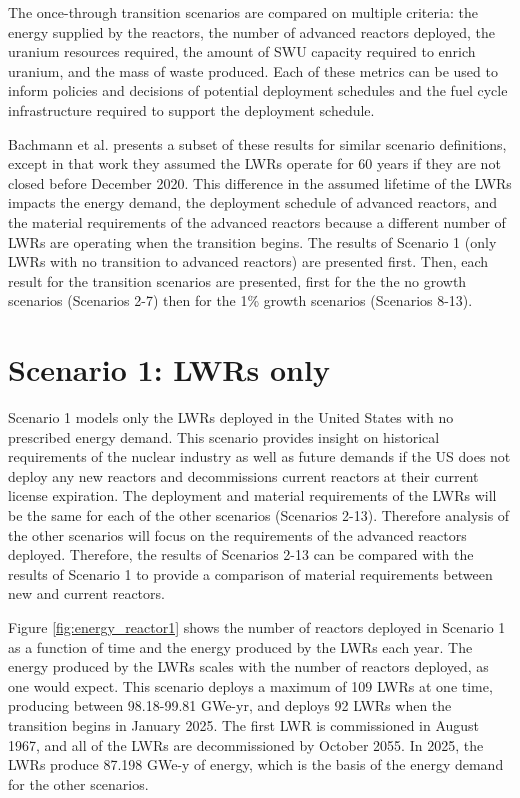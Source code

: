 The once-through transition scenarios are compared on multiple 
criteria: the energy supplied by the reactors, the number of advanced reactors deployed, 
the uranium resources required, the amount of \gls{SWU} capacity required 
to enrich uranium,
and the mass of waste produced. Each of these metrics can be used to inform 
policies and decisions of potential deployment schedules and the 
fuel cycle infrastructure required to support the deployment schedule. 

Bachmann et al. \cite{bachmann_enrichment_2021} presents a subset of 
these results for similar scenario definitions, except in that work 
they assumed the 
\glspl{LWR} operate for 60 years if they are not closed before December 
2020. This difference in 
the assumed lifetime of the \glspl{LWR} impacts the energy demand, 
the deployment schedule of advanced reactors, and the material 
requirements of the advanced reactors because a different number of 
\glspl{LWR} are operating when the transition begins. The results of 
Scenario 1 (only \glspl{LWR} with no transition to advanced reactors) 
are presented first. Then, each result for the transition scenarios are 
presented, first for the the no growth scenarios 
(Scenarios 2-7) then for the 1\% growth scenarios (Scenarios 
8-13).

\section{Scenario 1: LWRs only}\label{sec:scenario1}
Scenario 1 models only the \glspl{LWR} deployed in the United States with no 
prescribed energy demand. This scenario provides insight on historical 
requirements of the nuclear industry as well as future demands if the 
US does not deploy any new reactors and decommissions current reactors at 
their current license expiration. The 
deployment and material requirements of the \glspl{LWR} will be the same 
for each of the other scenarios (Scenarios 2-13). Therefore analysis 
of the other scenarios will focus on the requirements of 
the advanced reactors deployed. Therefore, the results of Scenarios 2-13 
can be compared with the results of Scenario 1 to provide a comparison 
of material requirements between new and current reactors. 

Figure \ref{fig:energy_reactor1} shows the number of 
reactors deployed in Scenario 1 as a function of time and the energy 
produced by the \glspl{LWR} each year. The energy produced by the 
\glspl{LWR} scales with the number of reactors deployed, as 
one would expect. This scenario deploys a maximum of 109 
\glspl{LWR} at one time, producing 
between 98.18-99.81 GWe-yr, and deploys 92 \glspl{LWR}
when the transition begins in January 2025. The first \gls{LWR} is 
commissioned in August 1967, and all of the \glspl{LWR} are
decommissioned by October 2055. In 2025, the \glspl{LWR} produce 
87.198 GWe-y of energy, which is the basis of the energy demand for 
the other scenarios. 


